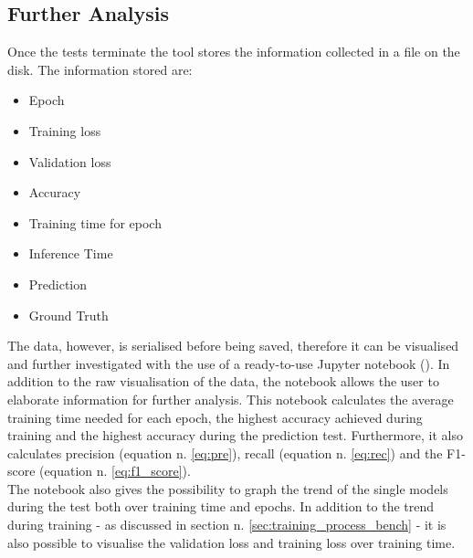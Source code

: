 \subsection{Further Analysis}
Once the tests terminate the tool stores the information collected in a file on the disk. The information stored are:
\begin{itemize}
\item Epoch
\item Training loss
\item Validation loss
\item Accuracy
\item Training time for epoch
\item Inference Time
\item Prediction
\item Ground Truth
\end{itemize}
The data, however, is serialised before being saved, therefore it can be visualised and further investigated with the use of a ready-to-use Jupyter notebook (\cite{Kluyver2016jupyter}). In addition to the raw visualisation of the data, the notebook allows the user to elaborate information for further analysis. This notebook calculates the average training time needed for each epoch, the highest accuracy achieved during training and the highest accuracy during the prediction test.  Furthermore, it also calculates precision (equation n. \ref{eq:pre}), recall (equation n. \ref{eq:rec}) and the F1-score (equation n. \ref{eq:f1_score}). \\
The notebook also gives the possibility to graph the trend of the single models during the test both over training time and epochs. In addition to the trend during training - as discussed in section n. \ref{sec:training_process_bench} - it is also possible to visualise the validation loss and training loss over training time. 
